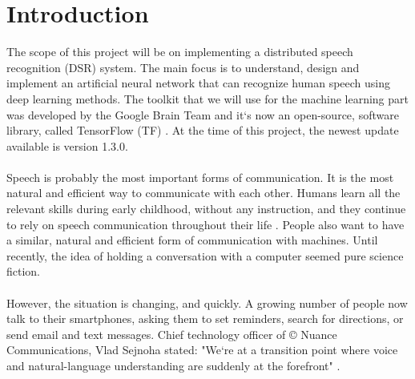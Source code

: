 \chapter{Introduction}\label{ch:introduction}
The scope of this project will be on implementing a distributed speech recognition (DSR) system.
The main focus is to understand, design and implement an artificial neural network that can recognize human speech using deep learning methods.
The toolkit that we will use for the machine learning part was developed by the Google Brain Team and it`s now an open-source, software library, called TensorFlow (TF) \cite{tensorflow2015-whitepaper}.
At the time of this project, the newest update available is version 1.3.0.\\\\
Speech is probably the most important forms of communication.
It is the most natural and efficient way to communicate with
each other. Humans learn all the relevant skills during early
childhood, without any instruction, and they continue to rely
on speech communication throughout their life \cite{kamblespeech}.
People also want to have a similar, natural and efficient form of communication with machines. 
Until recently, the idea of holding a conversation with a computer seemed pure science fiction.\\\\
However, the situation is changing, and quickly.
A growing number of people now talk to their smartphones, asking them to set reminders, search for directions, or send email and text messages.
Chief technology officer of \copyright{} Nuance Communications, Vlad Sejnoha stated: "We`re at a transition point where voice and natural-language understanding are suddenly at the forefront" \cite{kamblespeech}.
